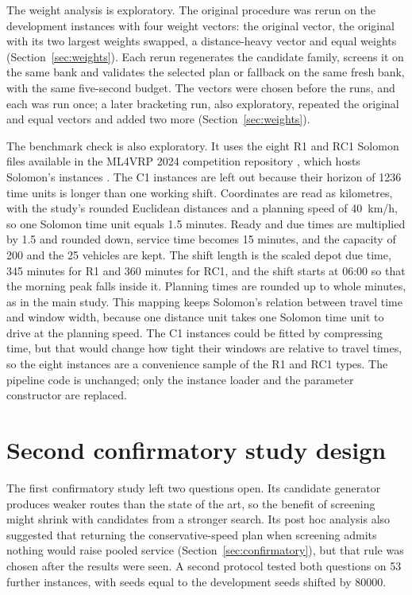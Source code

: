 \documentclass[11pt,a4paper]{article}
\begin{document}
The weight analysis is exploratory. The original procedure was rerun on the
development instances with four weight vectors: the original vector, the original
with its two largest weights swapped, a distance-heavy vector and equal weights
(Section~\ref{sec:weights}). Each rerun regenerates the candidate family,
screens it on the same bank and validates the selected plan or fallback on the
same fresh bank, with the same five-second budget. The vectors were chosen before
the runs, and each was run once; a later bracketing run, also exploratory,
repeated the original and equal vectors and added two more
(Section~\ref{sec:weights}).

The benchmark check is also exploratory. It uses the eight R1 and RC1 Solomon
files available in the ML4VRP 2024 competition repository \cite{ml4vrp2024},
which hosts Solomon's instances \cite{solomon1987}. The C1 instances are left out
because their horizon of 1236 time units is longer than one working shift.
Coordinates are read as kilometres, with the study's rounded Euclidean distances
and a planning speed of 40~km/h, so one Solomon time unit equals 1.5 minutes.
Ready and due times are multiplied by 1.5 and rounded down, service time becomes
15 minutes, and the capacity of 200 and the 25 vehicles are kept. The shift
length is the scaled depot due time, 345 minutes for R1 and 360 minutes for RC1,
and the shift starts at 06:00 so that the morning peak falls inside it. Planning
times are rounded up to whole minutes, as in the main study. This mapping keeps
Solomon's relation between travel time and window width, because one distance
unit takes one Solomon time unit to drive at the planning speed. The C1 instances
could be fitted by compressing time, but that would change how tight their
windows are relative to travel times, so the eight instances are a convenience
sample of the R1 and RC1 types. The pipeline code is unchanged; only the instance
loader and the parameter constructor are replaced.

\section{Second confirmatory study design}\label{sec:conf2design}

The first confirmatory study left two questions open. Its candidate generator
produces weaker routes than the state of the art, so the benefit of screening
might shrink with candidates from a stronger search. Its post hoc analysis also
suggested that returning the conservative-speed plan when screening admits
nothing would raise pooled service (Section~\ref{sec:confirmatory}), but that
rule was chosen after the results were seen. A second protocol tested both
questions on 53 further instances, with seeds equal to the development seeds
shifted by 80000.
\end{document}
